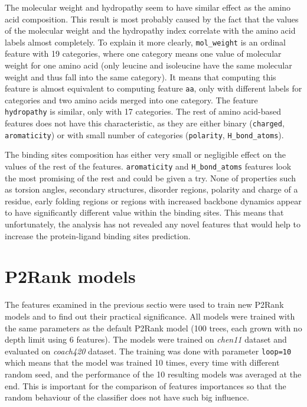 The molecular weight and hydropathy seem to have similar effect as the amino acid composition. This result is most probably caused by the fact that the values of the molecular weight and the hydropathy index correlate with the amino acid labels almost completely. To explain it more clearly, \texttt{mol\_weight} is an ordinal feature with 19 categories, where one category means one value of molecular weight for one amino acid (only leucine and isoleucine have the same molecular weight and thus fall into the same category). It means that computing this feature is almost equivalent to computing feature \texttt{aa}, only with different labels for categories and two amino acids merged into one category. The feature \texttt{hydropathy} is similar, only with 17 categories. The rest of amino acid-based features does not have this characteristic, as they are either binary (\texttt{charged}, \texttt{aromaticity}) or with small number of categories (\texttt{polarity}, \texttt{H\_bond\_atoms}).


The binding sites composition has either very small or negligible effect on the values of the rest of the features. \texttt{aromaticity} and \texttt{H\_bond\_atoms} features look the most promising of the rest and could be given a try. None of properties such as torsion angles, secondary structures, disorder regions, polarity and charge of a residue, early folding regions or regions with increased backbone dynamics appear to have significantly different value within the binding sites. This means that unfortunately, the analysis has not revealed any novel features that would help to increase the protein-ligand binding sites prediction.

\newpage

\section{P2Rank models}

The features examined in the previous sectio were used to train new P2Rank models and to find out their practical significance. All models were trained with the same parameters as the default P2Rank model (100 trees, each grown with no depth limit using 6 features). The models were trained on \textit{chen11} dataset and evaluated on \textit{coach420} dataset. The training was done with parameter \texttt{loop=10} which means that the model was trained 10 times, every time with different random seed, and the performance of the 10 resulting models was averaged at the end. This is important for the comparison of features importances so that the random behaviour of the classifier does not have such big influence.

